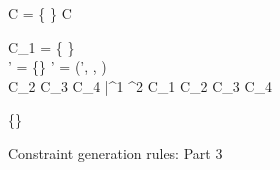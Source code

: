 \begin{figure*}[t!]
  {
     \spc
     \spc
    \spc
    C = \{ \rgn \in \rhoenv \}
  }
  {
     {C}
  }

  {
    C_1 = \{ \rgn \in \rhoenv \}
    \\
    \rhobar \notin \rhoenv \spc
    \rhoenv' = \rhoenv \cup \{\rhobar\} \spc
    \A' = (\rhoenv', \aenv, \phicx \conj \phi)
    \\
     {C_2} \spc 
     {C_3} \spc
     {C_4}
  }
  {
    \typeok{(\rhoenv,\aenv,\phicx)} {\inang{\rhobar \,|\, \phi} \bar{\tau^1} \xrightarrow{\rgn} \tau^2} 
       {C_1 \cup C_2 \cup C_3 \cup C_4}
  }

  { 
  }
  {
    \typeok {(\rhoenv,\aenv,\phicx)} {\RgnZ{}\inang{\toprgn}} {\{\}}
  }

\myendrules

\caption{Constraint generation rules: Part 3}
\label{fig:constraint-gen-2}
\end{figure*}
